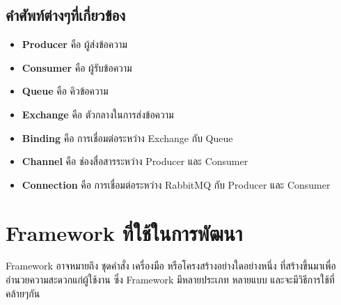   \subsection{คำศัพท์ต่างๆที่เกี่ยวข้อง}
  \begin{itemize}
    \item \textbf{Producer} คือ ผู้ส่งข้อความ
    \item \textbf{Consumer} คือ ผู้รับข้อความ
    \item \textbf{Queue} คือ คิวข้อความ
    \item \textbf{Exchange} คือ ตัวกลางในการส่งข้อความ
    \item \textbf{Binding} คือ การเชื่อมต่อระหว่าง Exchange กับ Queue
    \item \textbf{Channel} คือ ช่องสื่อสารระหว่าง Producer และ Consumer
    \item \textbf{Connection} คือ การเชื่อมต่อระหว่าง RabbitMQ กับ Producer และ Consumer
  \end{itemize}



\section{Framework ที่ใช้ในการพัฒนา}
\hspace{1.27cm}Framework อาจหมายถึง ชุดคำสั่ง เครื่องมือ หรือโครงสร้างอย่างใดอย่างหนึ่ง
ที่สร้างขึ้นมาเพื่ออำนวยความสะดวกแก่ผู้ใช้งาน ซึ่ง Framework มีหลายประเภท หลายแบบ และจะมีวิธีการใช้ที่คล้ายๆกัน
